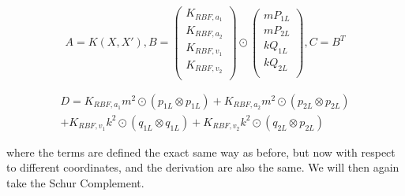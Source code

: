 \documentclass{statsmsc}
\begin{document}
$$
A=K(X, X'), 
B=\begin{pmatrix}
    K_{RBF, a_1}\\
    K_{RBF, a_2}\\
    K_{RBF, v_1}\\
    K_{RBF, v_2}\\
\end{pmatrix}\odot
\begin{pmatrix}
mP_{1L}  \\
mP_{2L}  \\
kQ_{1L}  \\
kQ_{2L}  \\
\end{pmatrix},
C=B^T 
$$

\begin{gather*}
D=K_{RBF,a_1}m^2\odot(p_{1L}\otimes p_{1L}) + K_{RBF,a_2}m^2\odot(p_{2L}\otimes p_{2L})\\+K_{RBF,v_1}k^2\odot(q_{1L}\otimes q_{1L})+K_{RBF,v_2}k^2\odot(q_{2L}\otimes p_{2L})
\end{gather*}

where the terms are defined the exact same way as before, but now with respect to different coordinates, and the derivation are also the same.
We will then again take the Schur Complement.
\end{document}
